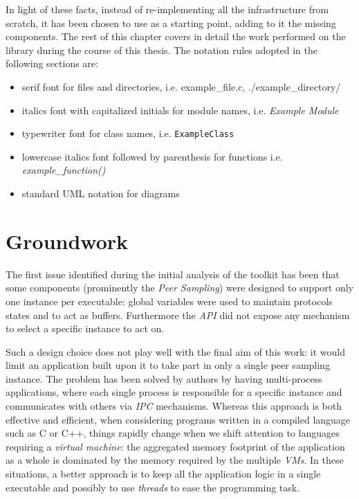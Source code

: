 In light of these facts, instead of re-implementing all the
infrastructure from scratch, it has been chosen to use \grapes as a
starting point, adding to it the missing components.
The rest of this chapter covers in detail the work performed on
the library during the course of this thesis. The notation rules
adopted in the following sections are:
\begin{itemize}
  \item serif font for files and directories, i.e. \textsf{example\_file.c},
    \textsf{./example\_directory/}
  \item italics font with capitalized initials for module names,
    i.e. \textit{Example Module}
 \item typewriter font for class names, i.e. \texttt{ExampleClass}
  \item lowercase italics font followed by parenthesis for functions
    i.e. \textit{example\_function()}
  \item standard UML notation for diagrams
\end{itemize}

\section{Groundwork}
The first issue identified during the initial analysis of
the toolkit has been that some components (prominently the \textit{Peer
  Sampling}) were designed to support only one instance per
executable: global variables were used to maintain protocols states and
to act as buffers. Furthermore the \emph{API} did not expose any mechanism
to select a specific instance to act on.

Such a design choice does not play well with the final aim of this work: it
would limit an application built upon it to take part in only a single
peer sampling instance. The problem has been solved by \grapes authors by
having multi-process applications, where each single process is
responsible for a specific instance and communicates with others
via \emph{IPC} mechanisms. Whereas this approach is both effective and
efficient, when considering programs written in a compiled language
such as C or C++, things rapidly change when we shift attention to
languages requiring a \emph{virtual machine}: the aggregated memory
footprint of the application as a whole is dominated by the memory
required by the multiple \emph{VMs}. In these situations, a better
approach is to keep all the application logic in a single executable
and possibly to use \emph{threads} to ease the programming task.

